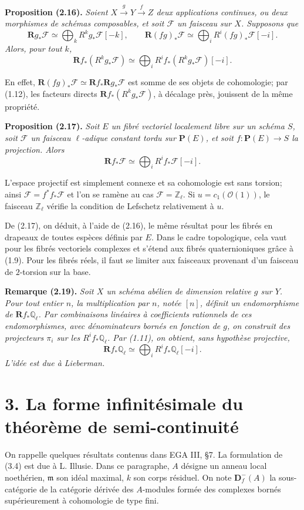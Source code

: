 \documentclass[11pt]{article}
\newcommand{\bD}{\mathbf D}
\newcommand{\cF}{\mathcal F}
\newcommand{\cO}{\mathcal O}
\newcommand{\bR}{\mathbf R}
\newcommand{\Ql}{\mathbb Q_\ell}
\newcommand{\Zl}{\mathbb Z_\ell}
\newenvironment{named}[1]{\par\medskip\noindent\textbf{#1}\itshape}{\par\medskip}
\begin{document}
\begin{named}{Proposition (2.16).}
Soient $X\xrightarrow{g}Y\xrightarrow{f}Z$ deux applications continues, ou deux morphismes de schémas composables, et soit $\cF$ un faisceau sur $X$. Supposons que
\[
\bR g_*\cF\simeq\bigoplus_k R^kg_*\cF[-k],\qquad
\bR(fg)_*\cF\simeq\bigoplus_iR^i(fg)_*\cF[-i].
\]
Alors, pour tout $k$,
\[
\bR f_*(R^kg_*\cF)\simeq\bigoplus_iR^if_*(R^kg_*\cF)[-i].
\]
\end{named}
En effet, $\bR(fg)_*\cF\simeq\bR f_*\bR g_*\cF$ est somme de ses objets de cohomologie; par (1.12), les facteurs directs $\bR f_*(R^kg_*\cF)$, à décalage près, jouissent de la même propriété.

\begin{named}{Proposition (2.17).}
Soit $E$ un fibré vectoriel localement libre sur un schéma $S$, soit $\cF$ un faisceau $\ell$-adique constant tordu sur $\mathbf P(E)$, et soit $f:\mathbf P(E)\to S$ la projection. Alors
\[
\bR f_*\cF\simeq\bigoplus_iR^if_*\cF[-i].
\]
\end{named}
L'espace projectif est simplement connexe et sa cohomologie est sans torsion; ainsi $\cF=f^*f_*\cF$ et l'on se ramène au cas $\cF=\Zl$. Si $u=c_1(\cO(1))$, le faisceau $\Zl$ vérifie la condition de Lefschetz relativement à $u$.

De (2.17), on déduit, à l'aide de (2.16), le même résultat pour les fibrés en drapeaux de toutes espèces définis par $E$. Dans le cadre topologique, cela vaut pour les fibrés vectoriels complexes et s'étend aux fibrés quaternioniques grâce à (1.9). Pour les fibrés réels, il faut se limiter aux faisceaux provenant d'un faisceau de $2$-torsion sur la base.

\begin{named}{Remarque (2.19).}
Soit $X$ un schéma abélien de dimension relative $g$ sur $Y$. Pour tout entier $n$, la multiplication par $n$, notée $[n]$, définit un endomorphisme de $\bR f_*\Ql$. Par combinaisons linéaires à coefficients rationnels de ces endomorphismes, avec dénominateurs bornés en fonction de $g$, on construit des projecteurs $\pi_i$ sur les $R^if_*\Ql$. Par (1.11), on obtient, sans hypothèse projective,
\[
\bR f_*\Ql\simeq\bigoplus_iR^if_*\Ql[-i].
\]
L'idée est due à Lieberman.
\end{named}

\section*{3. La forme infinitésimale du théorème de semi-continuité}
On rappelle quelques résultats contenus dans EGA III, §7. La formulation de (3.4) est due à L. Illusie. Dans ce paragraphe, $A$ désigne un anneau local noethérien, $\mathfrak m$ son idéal maximal, $k$ son corps résiduel. On note $\bD^-_f(A)$ la sous-catégorie de la catégorie dérivée des $A$-modules formée des complexes bornés supérieurement à cohomologie de type fini.
\end{document}
